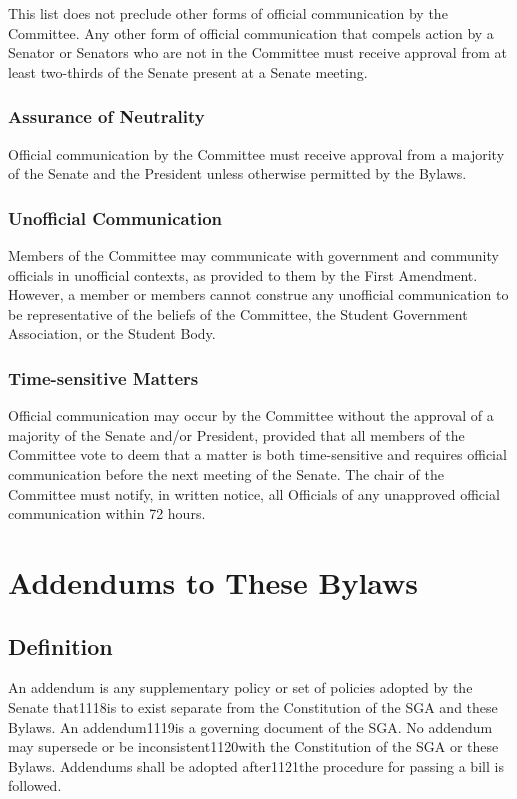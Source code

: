 \documentclass[12pt]{scrreprt}
\begin{document}
This list does not preclude other forms of official communication by the Committee. Any
other form of official communication that compels action by a Senator or Senators who
are not in the Committee must receive approval from at least two-thirds of the Senate
present at a Senate meeting.

\subsection{Assurance of Neutrality}
Official communication by the Committee must receive approval from a majority of the
Senate and the President unless otherwise permitted by the Bylaws.

\subsection{Unofficial Communication}
Members of the Committee may communicate with government and community officials
in unofficial contexts, as provided to them by the First Amendment. However, a member
or members cannot construe any unofficial communication to be representative of the
beliefs of the Committee, the Student Government Association, or the Student Body.

\subsection{Time-sensitive Matters}
Official communication may occur by the Committee without the approval of a majority
of the Senate and/or President, provided that all members of the Committee vote to
deem that a matter is both time-sensitive and requires official communication before the
next meeting of the Senate. The chair of the Committee must notify, in written notice, all
Officials of any unapproved official communication within 72 hours.


\chapter{Addendums to These Bylaws} \label{sec:addendums}

\section{Definition}
An addendum is any supplementary policy or set of policies adopted by the Senate that1118is to exist separate from the Constitution of the SGA and these Bylaws.  An addendum1119is a governing document of the SGA. No addendum may supersede or be inconsistent1120with the Constitution of the SGA or these Bylaws.  Addendums shall be adopted after1121the procedure for passing a bill is followed.
\end{document}
